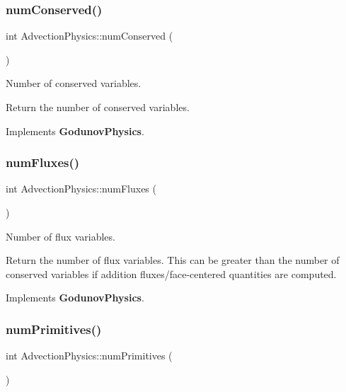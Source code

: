 \subsubsection{\texorpdfstring{num\+Conserved()}{numConserved()}}
{\footnotesize\ttfamily int Advection\+Physics\+::num\+Conserved (\begin{DoxyParamCaption}{ }\end{DoxyParamCaption})\hspace{0.3cm}{\ttfamily [virtual]}}



Number of conserved variables. 

Return the number of conserved variables. 

Implements \textbf{ Godunov\+Physics}.

\mbox{\label{class_advection_physics_ab59b268a446dbe2912e000c11870ab2f}} 
\subsubsection{\texorpdfstring{num\+Fluxes()}{numFluxes()}}
{\footnotesize\ttfamily int Advection\+Physics\+::num\+Fluxes (\begin{DoxyParamCaption}{ }\end{DoxyParamCaption})\hspace{0.3cm}{\ttfamily [virtual]}}



Number of flux variables. 

Return the number of flux variables. This can be greater than the number of conserved variables if addition fluxes/face-\/centered quantities are computed. 

Implements \textbf{ Godunov\+Physics}.

\mbox{\label{class_advection_physics_ad00c2d52ec684668ff5cd1da9eed42bf}} 
\subsubsection{\texorpdfstring{num\+Primitives()}{numPrimitives()}}
{\footnotesize\ttfamily int Advection\+Physics\+::num\+Primitives (\begin{DoxyParamCaption}{ }\end{DoxyParamCaption})\hspace{0.3cm}{\ttfamily [virtual]}}



